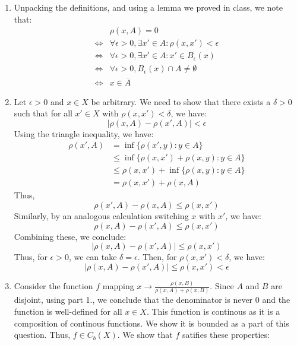 \documentclass[12pt]{article}
\begin{document}
\begin{solution}
    \bbni
    \begin{enumerate}
        \item Unpacking the definitions, and using a lemma we proved in class, we note that:
        \begin{align*}
            &\rho(x, A) = 0  \\
            \iff &\forall \epsilon > 0, \exists x' \in A: \rho(x,x') < \epsilon \\
            \iff &\forall \epsilon > 0, \exists x' \in A: x' \in B_\epsilon(x) \\
            \iff &\forall \epsilon > 0, B_\epsilon(x) \cap A \neq \emptyset \\
            \iff &x \in \overline{A}
        \end{align*}
        \item Let $\epsilon > 0$ and $x \in X$ be arbitrary. We need to show that there exists a $\delta > 0$ such that for all $x' \in X$ with $\rho(x, x') < \delta$, we have:
        \[|\rho(x, A) - \rho(x', A)| < \epsilon\]
        Using the triangle inequality, we have:
        \begin{align*}
            \rho(x', A) &= \inf\{ \rho(x', y) : y\in A \} \\
            &\leq \inf\{ \rho(x, x') + \rho(x, y) : y \in A \} \\
            &\leq \rho(x, x') + \inf\{ \rho(x, y) : y \in A \} \\
            &= \rho(x, x') + \rho(x, A)
        \end{align*}
        Thus, 
        \[ \rho(x', A) - \rho(x, A) \leq \rho(x, x') \]
        Similarly, by an analogous calculation switching $x$ with $x'$, we have:
        \[ \rho(x, A) - \rho(x', A) \leq \rho(x, x') \]
        Combining these, we conclude: 
        \[ |\rho(x, A) - \rho(x', A)| \leq \rho(x, x')\]
        Thus, for $\epsilon > 0$, we can take $\delta = \epsilon$. Then, for $\rho(x, x') < \delta$, we have:
        \[ |\rho(x, A) - \rho(x', A)| \leq \rho(x, x') < \epsilon \]
        \item Consider the function $f$ mapping $x \to \frac{\rho(x, B)}{\rho(x, A) + \rho(x, B)}$. Since $A$ and $B$ are disjoint, using part 1., we conclude that the denominator is never $0$ and the function is well-defined for all $x \in X$. This function is continous as it is a composition of continous functions.  We show it is bounded as a part of this question. Thus, $f \in C_b(X)$. We show that $f$ satifies these properties:  

\end{enumerate}
\end{solution}
\end{document}
